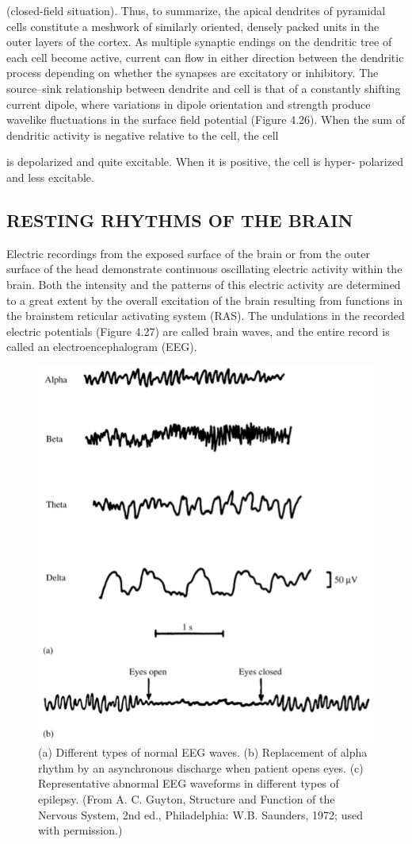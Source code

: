 (closed-field situation).
Thus, to summarize, the apical dendrites of pyramidal cells constitute a
meshwork of similarly oriented, densely packed units in the outer layers of the
cortex. As multiple synaptic endings on the dendritic tree of each cell become
active, current can flow in either direction between the dendritic process
depending on whether the synapses are excitatory or inhibitory. The
source–sink relationship between dendrite and cell is that of a constantly
shifting current dipole, where variations in dipole orientation and strength
produce wavelike fluctuations in the surface field potential (Figure 4.26).
When the sum of dendritic activity is negative relative to the cell, the cell

is depolarized and quite excitable. When it is positive, the cell is hyper-
polarized and less excitable.

\subsection{RESTING RHYTHMS OF THE BRAIN}

Electric recordings from the exposed surface of the brain or from the outer
surface of the head demonstrate continuous oscillating electric activity within
the brain. Both the intensity and the patterns of this electric activity are
determined to a great extent by the overall excitation of the brain resulting
from functions in the brainstem reticular activating system (RAS). The
undulations in the recorded electric potentials (Figure 4.27) are called brain
waves, and the entire record is called an electroencephalogram (EEG).

\begin{figure}
\centering
\includegraphics[width=0.7\linewidth]{figura_4.png} 
\caption{(a) Different types of normal EEG waves. (b) Replacement of
alpha rhythm by an asynchronous discharge when patient opens eyes.
(c) Representative abnormal EEG waveforms in different types of epilepsy.
(From A. C. Guyton, Structure and Function of the Nervous System, 2nd ed.,
Philadelphia: W.B. Saunders, 1972; used with permission.)}
\end{figure}

